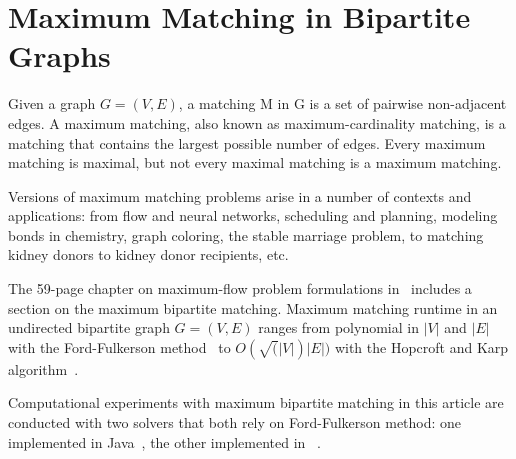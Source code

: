 \section{Maximum Matching in Bipartite Graphs} \label{sec_matching}
\noindent
%
%
Given a graph $G=(V,E)$, a matching M in G is a set of pairwise non-adjacent edges.
A maximum matching, also known as maximum-cardinality matching,
is a matching that contains the largest possible number of edges. 
Every maximum matching is maximal, but not every maximal matching 
is a maximum matching.

Versions of maximum matching problems arise in a number of contexts
and applications:
from flow and neural networks, scheduling and planning, modeling bonds 
in chemistry, graph coloring, the stable marriage problem, 
to matching kidney donors to kidney donor recipients, etc.

The 59-page chapter on maximum-flow problem formulations 
in~\cite{OPUS-book_algs-1990-MCGraw_Hill-Cormen} includes a section on the
maximum bipartite matching.
Maximum matching runtime in an undirected bipartite graph $G=(V, E)$
ranges from polynomial in $|V|$ and $|E|$ with the  
Ford-Fulkerson method~\cite{OPUS-matching-1956-Math-Ford_Fulkerson-max_flows}
%
to  $O(\sqrt(|V|) |E|)$ with the 
Hopcroft and Karp algorithm~\cite{OPUS-matching-1973-SIAM-Hopcroft_Karp}. 

Computational experiments with maximum bipartite matching in this article are conducted with two solvers that both rely on Ford-Fulkerson method:
one implemented in Java~\cite{OPUS-matching-2021-geeksforgeeks-java}, 
the other implemented in \R{}~\cite{OPUS-matching-2021-igraph-R}.

